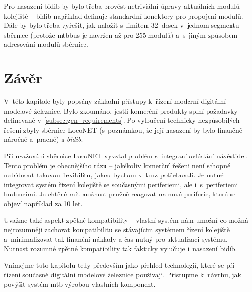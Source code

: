 Pro nasazení \gls{bidib} by bylo třeba provést netriviální úpravy
aktuálních modulů kolejiště – \gls{bidib} například definuje standardní
konektory pro propojení modulů. Dále by bylo třeba vyřešit, jak naložit
s~limitem 32~desek v~jednom segmentu sběrnice (protože \gls{mtbbus} je navržen
až pro 255 modulů) a~s~jiným způsobem adresování modulů sběrnice.
\section{Závěr}

V~této kapitole byly popsány základní přístupy k~řízení moderní digitální
modelové železnice. Bylo zkoumáno, jestli komerční produkty splní požadavky
definované v~\ref{subsec:gen_requirements}. Po vyloučení technicky
nezpůsobilých řešení zbyly sběrnice LocoNET (s~poznámkou,
že její nasazení by bylo finančně náročné a~pracné) a \textit{\gls{bidib}}.

Při uvažování sběrnice LocoNET vyvstal problém s~integrací ovládání
návěstidel. Tento problém je obecnějšího rázu – jakékoliv komerční řešení není
schopné nabídnout takovou flexibilitu, jakou bychom v~\gls{kmz} potřebovali.
Je nutné integrovat systém řízení kolejiště se současnými periferiemi, ale
i~s~periferiemi budoucími. Je chtěné mít možnost pružně reagovat na nové
periferie, které se objeví například za 10 let.

Uvažme také aspekt zpětné kompatibility – vlastní systém nám umožní co možná
nejrozumněji zachovat kompatibilitu se stávajícím systémem řízení kolejiště
a~minimalizovat tak finanční náklady a čas nutný pro aktualizaci systému.
Nutnost rozumné zpětné kompatibility tak fakticky vylučuje i~nasazení
\gls{bidib}.

Vnímejme tuto kapitolu tedy především jako přehled technologií, které se
při řízení současné digitální modelové železnice používají. Přistupme k~návrhu,
jak povýšit systém \gls{mtb} výrobou vlastních komponent.
